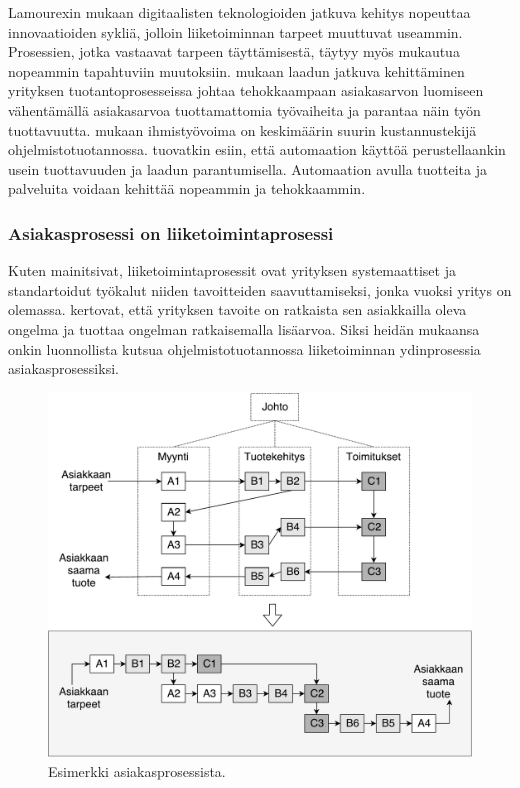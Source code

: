 \documentclass[finnish,12pt,a4paper,pdftex]{article}
\begin{document}
Lamourexin \citeyearpar{lamoureux} mukaan digitaalisten teknologioiden jatkuva kehitys nopeuttaa innovaatioiden sykliä, jolloin liiketoiminnan tarpeet muuttuvat useammin. Prosessien, jotka vastaavat tarpeen täyttämisestä, täytyy myös mukautua nopeammin tapahtuviin muutoksiin. \cite{teollisuustalous} mukaan laadun jatkuva kehittäminen yrityksen tuotantoprosesseissa johtaa tehokkaampaan asiakasarvon luomiseen vähentämällä asiakasarvoa tuottamattomia työvaiheita ja parantaa näin työn tuottavuutta. \cite{ohjelmistotuotanto} mukaan ihmistyövoima on keskimäärin suurin kustannustekijä ohjelmistotuotannossa. \cite{teollisuustalous} tuovatkin esiin, että automaation käyttöä perustellaankin usein tuottavuuden ja laadun parantumisella. Automaation avulla tuotteita ja palveluita voidaan kehittää nopeammin ja tehokkaammin.

\subsubsection{Asiakasprosessi on liiketoimintaprosessi}

Kuten \cite{teollisuustalous} mainitsivat, liiketoimintaprosessit ovat yrityksen systemaattiset ja standartoidut työkalut niiden tavoitteiden saavuttamiseksi, jonka vuoksi yritys on olemassa. \cite{ohjelmistotuotanto} kertovat, että yrityksen tavoite on ratkaista sen asiakkailla oleva ongelma ja tuottaa ongelman ratkaisemalla lisäarvoa. Siksi heidän mukaansa onkin luonnollista kutsua ohjelmistotuotannossa liiketoiminnan ydinprosessia asiakasprosessiksi.

\begin{figure}[!h]
    \centering
    \includegraphics[scale=0.45]{images/Prosessikaavion.pdf}
    \caption{Esimerkki asiakasprosessista. \citep{ohjelmistotuotanto}}
    \label{fig:liikark}
\end{figure}
\end{document}
